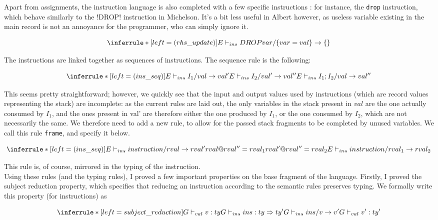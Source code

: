 \documentclass{report}
\begin{document}
Apart from assignments, the instruction language is also completed with a few specific instructions : for instance, the \lstinline{drop} instruction, which behave similarly to the !DROP! instruction in Michelson. It's a bit less useful in Albert however, as useless variable existing in the main record is not an annoyance for the programmer, who can simply ignore it.

$$
\inferrule* [left=(rhs\_update)]
    { }
    { E \vdash_{ins} DROP var / \{ var = val \} \rightarrow \{ \} }
$$

The instructions are linked together as sequences of instructions. The sequence rule is the following:

$$
\inferrule* [left=(ins\_seq)]
    { E \vdash_{ins} I_1 / val \rightarrow val' \\
      E \vdash_{ins} I_2 / val' \rightarrow val'' }
    { E \vdash_{ins} I_1 ; I_2 / val \rightarrow val'' }
$$

This seems pretty straightforward; however, we quickly see that the input and output values used by instructions (which are record values representing the stack) are incomplete: as the current rules are laid out, the only variables in the stack present in $val$ are the one actually consumed by $I_1$, and the ones present in val' are therefore either the one produced by $I_1$, or the one consumed by $I_2$, which are not necessarily the same. We therefore need to add a new rule, to allow for the passed stack fragments to be completed by unused variables. We call this rule \texttt{frame}, and specify it below.

$$
\inferrule* [left=(ins\_seq)]
    { E \vdash_{ins} instruction / rval \rightarrow rval' \\
      rval @ rval'' = rval_1 \\
      rval' @ rval'' = rval_2 }
    { E \vdash_{ins} instruction / rval_1 \rightarrow rval_2 }
$$

This rule is, of course, mirrored in the typing of the instruction.\\

Using these rules (and the typing rules), I proved a few important properties on the base fragment of the language. Firstly, I proved the subject reduction property, which specifies that reducing an instruction according to the semantic rules preserves typing. We formally write this property (for instructions) as

$$
\inferrule* [left=subject\_reduction]
            { G \vdash_{val} v : ty \\ G \vdash_{ins} ins : ty \Rightarrow ty' \\ G \vdash_{ins} ins / v \rightarrow v' }
            { G \vdash_{val} v' : ty' }
$$
\end{document}
